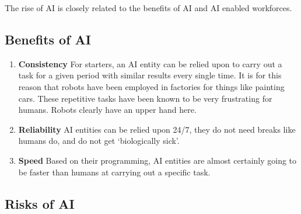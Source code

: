 \documentclass[12pt, a4paper]{report}
\begin{document}
The rise of AI is closely related to the benefits of AI and AI enabled workforces.\\

\subsection*{Benefits of AI}
\begin{enumerate}
\item  \textbf{Consistency} For starters, an AI entity can be relied upon to carry
out a task for a given period with similar results every single time. It is for this
reason that robots have been employed in factories for things like painting cars. These
repetitive tasks have been known to be very frustrating for humans. Robots clearly have
an upper hand here.
\item \textbf{Reliability} AI entities can be relied upon 24/7, they do not need
breaks like humans do, and do not get `biologically sick'.
\item \textbf{Speed} Based on their programming, AI entities are almost certainly
going to be faster than humans at carrying out a specific task.
\end{enumerate}

\subsection*{Risks of AI}
\end{document}
